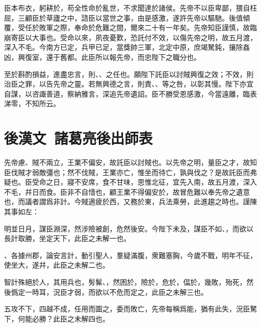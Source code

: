 臣本布衣，躬耕於，苟全性命於亂世，不求聞達於諸侯。先帝不以臣卑鄙，猥自枉屈，三顧臣於草廬之中，諮臣以當世之事，由是感激，遂許先帝以驅馳。後值傾覆，受任於敗軍之際，奉命於危難之間，爾來二十有一年矣。先帝知臣謹慎，故臨崩寄臣以大事也。受命以來，夙夜憂歎，恐託付不效，以傷先帝之明，故五月渡，深入不毛。今南方已定，兵甲已足，當獎帥三軍，北定中原，庶竭駑鈍，攘除姦凶，興復室，還于舊都。此臣所以報先帝，而忠陛下之職分也。

至於斟酌損益，進盡忠言，則、、之任也。願陛下託臣以討賊興復之效；不效，則治臣之罪，以告先帝之靈。若無興德之言，則責、、等之咎，以彰其慢。陛下亦宜自謀，以咨諏善道，察納雅言，深追先帝遺詔。臣不勝受恩感激，今當遠離，臨表涕零，不知所云。

\theendnotes

\section[諸葛亮後出師表\quad{\small 後漢文}]{{\normalsize 後漢文\ 諸葛亮}\quad 後出師表}
先帝慮、賊不兩立，王業不偏安，故託臣以討賊也。以先帝之明，量臣之才，故知臣伐賊才弱敵彊也；然不伐賊，王業亦亡，惟坐而待亡，孰與伐之？是故託臣而弗疑也。臣受命之日，寢不安席，食不甘味，思惟北征，宜先入南，故五月渡，深入不毛，幷日而食。臣非不自惜也，顧王業不得偏安於，故冒危難以奉先帝之遺意也，而議者謂爲非計。今賊適疲於西，又務於東，兵法乘勞，此進趨之時也。謹陳其事如左：

明並日月，謀臣淵深，然涉險被創，危然後安。今陛下未及，謀臣不如、，而欲以長計取勝，坐定天下，此臣之未解一也。

、各據州郡，論安言計，動引聖人，羣疑滿腹，衆難塞胸，今歲不戰，明年不征，使坐大，遂幷，此臣之未解二也。

智計殊絕於人，其用兵也，髣髴、，然困於，險於，危於，偪於，幾敗，殆死，然後僞定一時耳，況臣才弱，而欲以不危而定之，此臣之未解三也。

五攻不下，四越不成，任用而圖之，委而敗亡，先帝每稱爲能，猶有此失，況臣駑下，何能必勝？此臣之未解四也。

